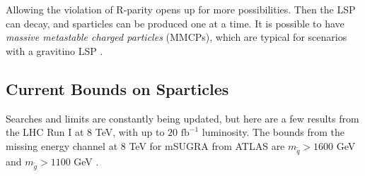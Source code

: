 \documentclass[twoside,english]{uiofysmaster}
\begin{document}
Allowing the violation of R-parity opens up for more possibilities. Then the LSP can decay, and sparticles can be produced one at a time. It is possible to have \textit{massive metastable charged particles} (MMCPs), which are typical for scenarios with a gravitino LSP \cite{batzing2017lecture}.



\subsection{Current Bounds on Sparticles}

Searches and limits are constantly being updated, but here are a few results from the LHC Run I at 8 TeV, with up to $20 \text{ fb}^{-1}$ luminosity. The bounds from the missing energy channel at 8 TeV for mSUGRA from ATLAS are $m_{\tilde{q}} > 1600$ GeV and $m_{\tilde{g}} > 1100$ GeV \cite{batzing2017lecture}.


%
%
\end{document}
